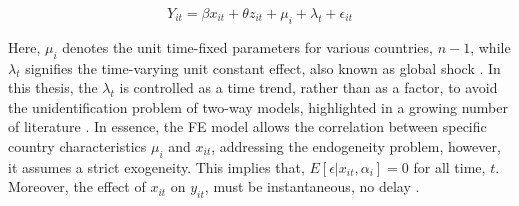 \begin{equation}
    Y_{it} = \beta x_{it} + \theta z_{it} + \mu_i + \lambda_t + \epsilon_{it}
    \label{eq2}
\end{equation}

Here, $\mu_i$ denotes the unit time-fixed parameters for various countries, $n-1$, while $\lambda_t$ signifies the time-varying unit constant effect, also known as global shock \parencite{seddig2020maximum}. In this thesis, the $\lambda_t$ is controlled as a time trend, rather than as a factor, to avoid the unidentification problem of two-way models, highlighted in a growing number of literature \parencite[see][]{kropko2020interpretation, imai2021use}. In essence, the FE model allows the correlation between specific country characteristics $\mu_i$ and $x_{it}$, addressing the endogeneity problem, however, it assumes a strict exogeneity. This implies that, $E[\epsilon | x_{it}, \alpha_i]  = 0$ for all time, $t$. Moreover, the effect of $x_{it}$ on $y_{it}$, must be instantaneous, no delay \parencite{seddig2020maximum}.










